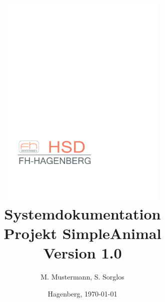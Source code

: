 \documentclass[12pt,naustrian,a4widepaper]{scrartcl}
\begin{document}


\title {\vspace{1cm}
       \includegraphics[width=8cm]{./Images/FhOOeLogoOkt2009_HSD_Rot_pastell}\\
       \vspace{2cm}
       {\textbf{Systemdokumentation\\Projekt SimpleAnimal}}\\
       \vspace{5mm}
       {\small{Version 1.0}}\\
       \vspace{5mm}
}

\author{\small{M. Mustermann, S. Sorglos}}
\date  {\small{Hagenberg, \today}}
\maketitle


\clearpage

\tableofcontents
\clearpage
\end{document}
